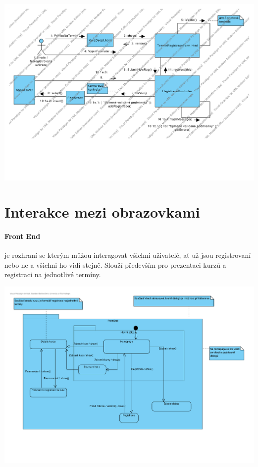 \documentclass[12pt,a4paper,titlepage,final]{report}
\begin{document}
\begin{center}
	\captionsetup{type=figure}
	\includegraphics[width=17cm]{img/prihlaseni-na-termin-com.pdf}
\end{center}

\section{Interakce mezi obrazovkami}

\paragraph{Front End} je rozhraní se kterým můžou interagovat všichni uživatelé, ať už jsou registrovaní nebo ne a všichni ho vidí stejně. Slouží především pro prezentaci kurzů a registraci na jednotlivé termíny.

\begin{center}
	\captionsetup{type=figure}
	\includegraphics[width=17cm]{img/frontend-obr.pdf}
\end{center}
\end{document}
